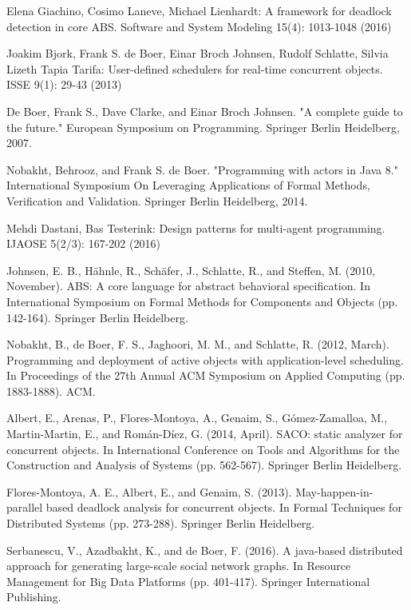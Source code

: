 \documentclass[runningheads,a4paper]{llncs}
\begin{document}
\begin{thebibliography}{4}
Elena Giachino, Cosimo Laneve, Michael Lienhardt:
A framework for deadlock detection in core ABS. Software and System Modeling 15(4): 1013-1048 (2016)


		Joakim Bjork, Frank S. de Boer, Einar Broch Johnsen, Rudolf Schlatte, Silvia Lizeth Tapia Tarifa:
		User-defined schedulers for real-time concurrent objects. ISSE 9(1): 29-43 (2013)
		
		De Boer, Frank S., Dave Clarke, and Einar Broch Johnsen. "A complete guide to the future." European Symposium on Programming. Springer Berlin Heidelberg, 2007.
		
		 Nobakht, Behrooz, and Frank S. de Boer. "Programming with actors in Java 8." International Symposium On Leveraging Applications of Formal Methods, Verification and Validation. Springer Berlin Heidelberg, 2014.
		
		 Mehdi Dastani, Bas Testerink:
		Design patterns for multi-agent programming. IJAOSE 5(2/3): 167-202 (2016)
		
		 Johnsen, E. B., Hähnle, R., Schäfer, J., Schlatte, R., and Steffen, M. (2010, November). ABS: A core language for abstract behavioral specification. In International Symposium on Formal Methods for Components and Objects (pp. 142-164). Springer Berlin Heidelberg.
		
		 Nobakht, B., de Boer, F. S., Jaghoori, M. M., and Schlatte, R. (2012, March). Programming and deployment of active objects with application-level scheduling. In Proceedings of the 27th Annual ACM Symposium on Applied Computing (pp. 1883-1888). ACM.
		
		 Albert, E., Arenas, P., Flores-Montoya, A., Genaim, S., Gómez-Zamalloa, M., Martin-Martin, E., and Román-Díez, G. (2014, April). SACO: static analyzer for concurrent objects. In International Conference on Tools and Algorithms for the Construction and Analysis of Systems (pp. 562-567). Springer Berlin Heidelberg.
		
		Flores-Montoya, A. E., Albert, E., and Genaim, S. (2013). May-happen-in-parallel based deadlock analysis for concurrent objects. In Formal Techniques for Distributed Systems (pp. 273-288). Springer Berlin Heidelberg.
		
		Serbanescu, V., Azadbakht, K., and de Boer, F. (2016). A java-based distributed approach for generating large-scale social network graphs. In Resource Management for Big Data Platforms (pp. 401-417). Springer International Publishing.
		

\end{thebibliography}
\end{document}
